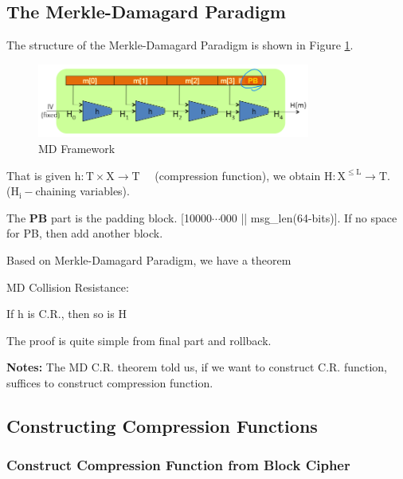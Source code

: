 \subsection{The Merkle-Damagard Paradigm}

The structure of the Merkle-Damagard Paradigm is shown in Figure \ref{fig: Lecture 4: MD Framework}.

\begin{figure}[h]
    \centering
    \includegraphics[width=0.8\textwidth]{Stanford_Crypto_1/fig/04_Integrity/MD iterated construction.png}
    \caption{MD Framework}
    \label{fig: Lecture 4: MD Framework}
\end{figure}

That is given $\mathrm{h}: \mathrm{T} \times \mathrm{X} \rightarrow \mathrm{T} \quad$ (compression function), we obtain $\mathrm{H}: \mathrm{X}^{\leq \mathrm{L}} \longrightarrow \mathrm{T} . \quad$ ($\mathrm{H}_{\mathrm{i}}-$chaining variables).

The \textbf{PB} part is the padding block. [10000$\cdots$000 || msg\_len(64-bits)]. If no space for PB, then add another block.

Based on Merkle-Damagard Paradigm, we have a theorem

\begin{theorem}  MD Collision Resistance:

    If h is C.R., then so is H
    
\end{theorem}

The proof is quite simple from final part and rollback.

\textbf{Notes: } The MD C.R. theorem told us, if we want to construct C.R. function, suffices to construct compression function.


\subsection{Constructing Compression Functions}

\subsubsection{Construct Compression Function from Block Cipher}

